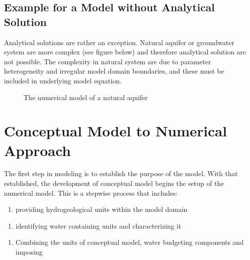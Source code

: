 \documentclass[letterpaper,10pt,english]{jupyterBook}
\begin{document}
\subsection{Example for a Model without Analytical Solution}
\label{\detokenize{content/modeling/31_intro_modeling:example-for-a-model-without-analytical-solution}}
\sphinxAtStartPar
Analytical solutions are rather an exception. Natural aquifer or groundwater system are more complex (see figure below) and therefore analytical solution are not possible. The complexity in natural system are due to parameter heterogeneity and irregular model domain boundaries, and these must be included in underlying model equation.

\begin{figure}[htbp]
\centering
\capstart

\noindent{}
\caption{The numerical model of a natural aquifer}\label{\detokenize{content/modeling/31_intro_modeling:nummodel}}\end{figure}


\section{Conceptual Model to Numerical Approach}
\label{\detokenize{content/modeling/31_intro_modeling:conceptual-model-to-numerical-approach}}
\sphinxAtStartPar
The first step in modeling is to establish the purpose of the model. With that established, the development of conceptual model begins the set\sphinxhyphen{}up of the numerical model. This is a step\sphinxhyphen{}wise process that includes:
\begin{enumerate}
%
\item {} 
\sphinxAtStartPar
{} \sphinxhyphen{} providing hydrogeological units within the model domain

\end{enumerate}
\begin{enumerate}
%
\item {} 
\sphinxAtStartPar
{} \sphinxhyphen{} identifying water containing units and characterizing it

\end{enumerate}
\begin{enumerate}
%
\item {} 
\sphinxAtStartPar
{} \sphinxhyphen{} Combining the units of conceptual model, water budgeting components and imposing 

\end{enumerate}
\end{document}
